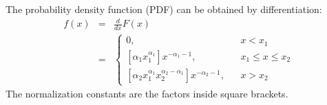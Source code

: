 \documentclass[letterpaper, 11pt]{article}
\begin{document}
The probability density function (PDF) can be obtained by differentiation:
\begin{eqnarray}
f(x) &=& \frac{d}{dx} F(x) \\
&=& \left\{
\begin{array}{lcr}
0, & & x < x_1 \\
\left[\alpha_1 x_1^{\alpha_1}\right]x^{-\alpha_1 - 1}, & & x_1 \leq x \leq x_2 \\
\left[\alpha_2 x_1^{\alpha_1} x_2^{\alpha_2 - \alpha_1}\right]x^{-\alpha_2 - 1}, & & x > x_2
\end{array}
\right.
\end{eqnarray}
The normalization constants are the factors inside square brackets.







\end{document}
